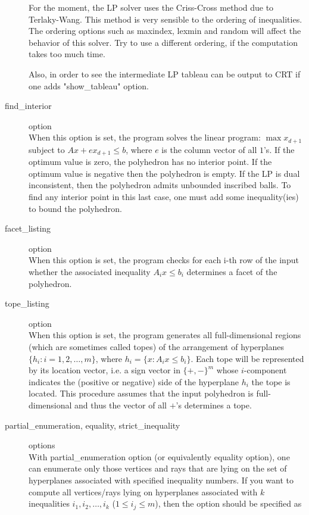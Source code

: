 \begin{description}
For the moment, the LP solver uses the Criss-Cross method due to 
Terlaky-Wang.  This method is very sensible to the ordering
of inequalities.  The ordering options such as maxindex, lexmin and 
random will affect the behavior of this solver.  Try to use
a different ordering, if the computation takes too much time.

Also, in order to see the intermediate LP tableau can be output
to CRT if one adds "show\_tableau" option.   

\item[find\_interior] option\\
When this option is set, the program solves the linear program: 
$\max x_{d+1}$
subject to $ A x + e x_{d+1} \le b$, where $e$ is the
column vector of all $1$'s.  If the optimum value is zero,
the polyhedron has no interior point.  If the optimum value is 
negative then the polyhedron is empty. If the LP is dual inconsistent,
then the polyhedron admits unbounded inscribed balls.  To find any
interior point in this last case, one must add some inequality(ies)
to bound the polyhedron. 

\item[facet\_listing] option\\
When this option is set, the program checks for each i-th row of the input 
whether the associated inequality $A_i x \le b_i$ determines a facet
of the polyhedron.  

\item[tope\_listing] option\\
When this option is set, the program generates all full-dimensional
regions (which are sometimes called topes) of the arrangement
of hyperplanes $\{ h_i : i = 1,2, \ldots, m \}$, where 
$ h_i = \{ x : A_i x \le b_i \}$.  Each tope will be
represented by its location vector, i.e. 
a sign vector in $\{+, -\} ^m$ whose $i$-component
indicates the (positive or negative) side of the hyperplane $h_i$
the tope is located.  This procedure assumes that the input
polyhedron is full-dimensional and thus the vector of all $+$'s
determines a tope. 

\item[partial\_enumeration, equality, strict\_inequality] options\\
With partial\_enumeration option (or equivalently equality option), 
one can enumerate only those
vertices and rays that are lying on the set of hyperplanes
associated with specified inequality numbers. If you want
to compute all vertices/rays lying on hyperplanes
associated with $k$ inequalities $i_1, i_2, \ldots, i_k$
($1 \le i_j \le m$), then
the option should be specified as


\end{description}
